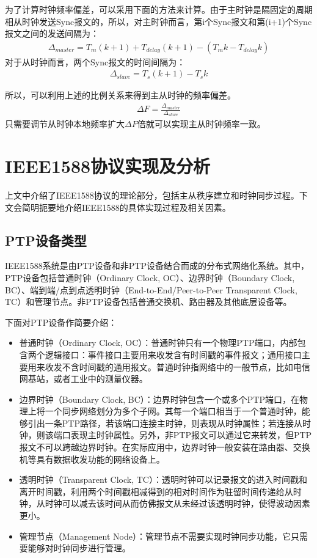 为了计算时钟频率偏差，可以采用下面的方法来计算。由于主时钟是隔固定的周期相从时钟发送Sync报文的，所以，对主时钟而言，第i个Sync报文和第(i+1)个Sync报文之间的发送间隔为：
\begin{align}
	\Delta _{master} = T_{m}(k + 1) + T_{delay}(k + 1) - (T_{m}k - T_{delay}k)
\end{align}
对于从时钟而言，两个Sync报文的时间间隔为：
\begin{align}
	\Delta _{slave} = T_{s}(k + 1) - T_{s}k
\end{align}

所以，可以利用上述的比例关系来得到主从时钟的频率偏差。
\begin{align}
	\Delta F = \frac{\Delta _{master}}{\Delta _{slave}}
\end{align}
只需要调节从时钟本地频率扩大$\Delta F$倍就可以实现主从时钟频率一致。

\section{IEEE1588协议实现及分析}
上文中介绍了IEEE1588协议的理论部分，包括主从秩序建立和时钟同步过程。下文会简明扼要地介绍IEEE1588的具体实现过程及相关因素。

\subsection{PTP设备类型}
IEEE1588系统是由PTP设备和非PTP设备结合而成的分布式网络化系统。其中，PTP设备包括普通时钟（Ordinary Clock, OC）、边界时钟（Boundary Clock, BC）、端到端/点到点透明时钟（End-to-End/Peer-to-Peer Transparent Clock, TC）和管理节点。非PTP设备包括普通交换机、路由器及其他底层设备等。

下面对PTP设备作简要介绍：
\begin{itemize}[noitemsep,topsep=0pt,parsep=0pt,partopsep=0pt]
	\item 普通时钟（Ordinary Clock, OC）：普通时钟只有一个物理PTP端口，内部包含两个逻辑接口：事件接口主要用来收发含有时间戳的事件报文；通用接口主要用来收发不含时间戳的通用报文。普通时钟指网络中的一般节点，比如电信网基站，或者工业中的测量仪器。
	\item 边界时钟（Boundary Clock, BC）：边界时钟包含一个或多个PTP端口，在物理上将一个同步网络划分为多个子网。其每一个端口相当于一个普通时钟，能够引出一条PTP路径，若该端口连接主时钟，则表现从时钟属性；若连接从时钟，则该端口表现主时钟属性。另外，非PTP报文可以通过它来转发，但PTP报文不可以跨越边界时钟。在实际应用中，边界时钟一般安装在路由器、交换机等具有数据收发功能的网络设备上。
	\item 透明时钟（Transparent Clock, TC）：透明时钟可以记录报文的进入时间戳和离开时间戳，利用两个时间戳相减得到的相对时间作为驻留时间传递给从时钟，从时钟可以减去该时间从而仿佛报文从未经过该透明时钟，使得波动因素更小。
	\item 管理节点（Management Node）：管理节点不需要实现时钟同步功能，它只需要能够对时钟同步进行管理。
\end{itemize}

